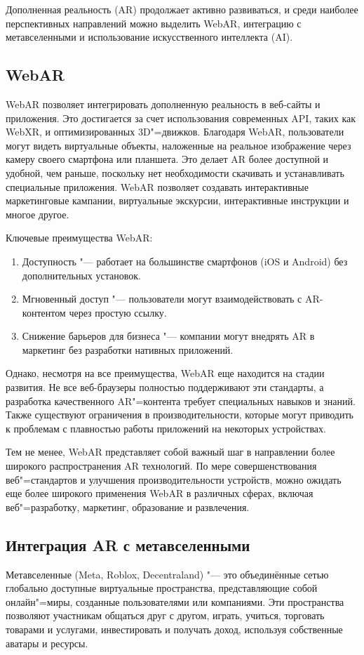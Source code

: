 Дополненная реальность (AR) продолжает активно развиваться, и среди наиболее перспективных направлений можно выделить WebAR, интеграцию с метавселенными и использование искусственного интеллекта (AI).

\subsection{WebAR}
WebAR позволяет интегрировать дополненную реальность в веб-сайты и приложения. 
Это достигается за счет использования современных API, таких как WebXR, и оптимизированных 3D"=движков. Благодаря WebAR, пользователи могут видеть виртуальные объекты, наложенные на реальное изображение через камеру своего смартфона или планшета. Это делает AR более доступной и удобной, чем раньше, поскольку нет необходимости скачивать и устанавливать специальные приложения. WebAR позволяет создавать интерактивные маркетинговые кампании, виртуальные экскурсии, интерактивные инструкции и многое другое.

Ключевые преимущества WebAR:
\begin{enumerate}
    \item Доступность "--- работает на большинстве смартфонов (iOS и Android) без дополнительных установок.
    \item Мгновенный доступ "--- пользователи могут взаимодействовать с AR-контентом через простую ссылку.
    \item Снижение барьеров для бизнеса "--- компании могут внедрять AR в маркетинг без разработки нативных приложений. 
\end{enumerate}

Однако, несмотря на все преимущества, WebAR еще находится на стадии развития. Не все веб-браузеры полностью поддерживают эти стандарты, а разработка качественного AR"=контента требует специальных навыков и знаний. Также существуют ограничения в производительности, которые могут приводить к проблемам с плавностью работы приложений на некоторых устройствах.

Тем не менее, WebAR представляет собой важный шаг в направлении более широкого распространения AR технологий. По мере совершенствования веб"=стандартов и улучшения производительности устройств, можно ожидать еще более широкого применения WebAR в различных сферах, включая веб"=разработку, маркетинг, образование и развлечения.

\subsection{Интеграция AR с метавселенными}
Метавселенные (Meta, Roblox, Decentraland) "--- это объединённые сетью глобально доступные виртуальные пространства, представляющие собой онлайн"=миры, созданные пользователями или компаниями. Эти пространства позволяют участникам общаться друг с другом, играть, учиться, торговать товарами и услугами, инвестировать и получать доход, используя собственные аватары и ресурсы.

